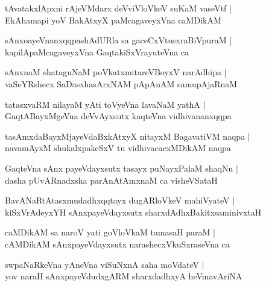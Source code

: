\documentclass[twoside,12pt,openright]{book}
\newcounter{shloka}[chapter]
\begin{document}
\begin{shloka}%
tAvatakxlApxni rAjeVMdarx deVviVloVkeV suKaM vaseVtf |\\
EkAhamapi yoV BakAtxyX paMcagaveyxVna caMDikAM 
\end{shloka}

\begin{shloka}%
sAnxoayeVnanxqqpashAdURla sa gaceCxVtusxraBiVpuraM |\\
kapilApaMcagaveyxVna GaqtakiSxVrayuteVna ca 
\end{shloka}

\begin{shloka}%
sAnxnaM shataguNaM poVkatxmitareVBoyxV narAdhipa |\\
vaSeYRshecx SaDasxhasArxNAM pApAnAM samupAjaRnaM 
\end{shloka}

\begin{shloka}%
tatasxvaRM nilayaM yAti toVyeVna lavaNaM yathA |\\
GaqtABayxMgeVna deVvAyxsutx kaqteVna vidhivananxqqpa 
\end{shloka}

\begin{shloka}%
tasAmxdaBayxMjayeVdaBxkAtxyX nitayxM BagavatiVM naqpa |\\
navamAyxM shukalxpakeSxV tu vidhivacacxMDikAM naqpa 
\end{shloka}

\begin{shloka}%
GaqteVna sAnx payeVdayxsutx tasayx puNayxPalaM shaqNu |\\
dasha pUvARnadxsha parAnAtAmxnaM ca visheVSataH 
\end{shloka}

\begin{shloka}%
BavANaRtAtasxmudadhxqqtayx dugARloVkeV mahiVyateV |\\
kiSxVrAdeyxYH sAnxpayeVdayxsutx sharxdAdhxBakitxsaminivxtaH
\end{shloka}

\begin{shloka}%
caMDikAM sa naroV yati goVloVkaM tamasaH paraM |\\
cAMDikAM sAnxpayeVdayxsutx narashecxVkuSxraseVna ca 
\end{shloka}

\begin{shloka}%
swpaNaRkeVna yAneVna viSuNxnA saha moVdateV |\\
yov naraH sAnxpayeVdudxgARM sharxdadhxyA heVmavAriNA 
\end{shloka}
\end{document}
